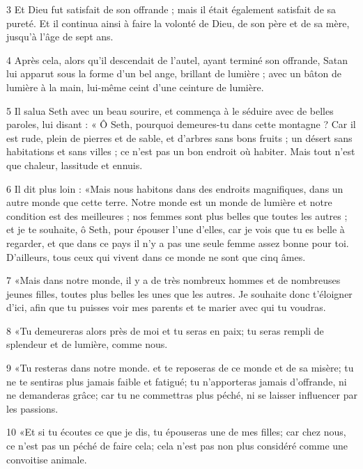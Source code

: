 \par 3 Et Dieu fut satisfait de son offrande ; mais il était également satisfait de sa pureté. Et il continua ainsi à faire la volonté de Dieu, de son père et de sa mère, jusqu'à l'âge de sept ans.

\par 4 Après cela, alors qu'il descendait de l'autel, ayant terminé son offrande, Satan lui apparut sous la forme d'un bel ange, brillant de lumière ; avec un bâton de lumière à la main, lui-même ceint d'une ceinture de lumière.

\par 5 Il salua Seth avec un beau sourire, et commença à le séduire avec de belles paroles, lui disant : « Ô Seth, pourquoi demeures-tu dans cette montagne ? Car il est rude, plein de pierres et de sable, et d'arbres sans bons fruits ; un désert sans habitations et sans villes ; ce n’est pas un bon endroit où habiter. Mais tout n’est que chaleur, lassitude et ennuis.

\par 6 Il dit plus loin : «Mais nous habitons dans des endroits magnifiques, dans un autre monde que cette terre. Notre monde est un monde de lumière et notre condition est des meilleures ; nos femmes sont plus belles que toutes les autres ; et je te souhaite, ô Seth, pour épouser l'une d'elles, car je vois que tu es belle à regarder, et que dans ce pays il n'y a pas une seule femme assez bonne pour toi. D'ailleurs, tous ceux qui vivent dans ce monde ne sont que cinq âmes.

\par 7 «Mais dans notre monde, il y a de très nombreux hommes et de nombreuses jeunes filles, toutes plus belles les unes que les autres. Je souhaite donc t'éloigner d'ici, afin que tu puisses voir mes parents et te marier avec qui tu voudras.

\par 8 «Tu demeureras alors près de moi et tu seras en paix; tu seras rempli de splendeur et de lumière, comme nous.

\par 9 «Tu resteras dans notre monde. et te reposeras de ce monde et de sa misère; tu ne te sentiras plus jamais faible et fatigué; tu n'apporteras jamais d'offrande, ni ne demanderas grâce; car tu ne commettras plus péché, ni se laisser influencer par les passions.

\par 10 «Et si tu écoutes ce que je dis, tu épouseras une de mes filles; car chez nous, ce n'est pas un péché de faire cela; cela n'est pas non plus considéré comme une convoitise animale.

